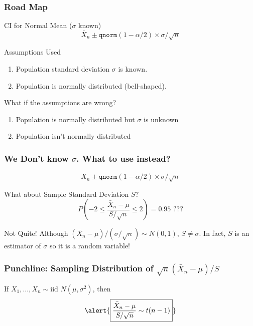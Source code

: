 \begin{frame}
  \frametitle{Road Map}
\begin{block}{CI for Normal Mean ($\sigma$ known)}
  \vspace{-1em}
  \[\bar{X}_n \pm \texttt{qnorm}(1-\alpha/2) \times \sigma/\sqrt{n}\]
\end{block}

\begin{block}{Assumptions Used}
	\begin{enumerate}
\item Population standard deviation $\sigma$ is known.
\item Population is normally distributed (bell-shaped).
\end{enumerate}
\end{block}

\begin{block}{What if the assumptions are wrong?}
\begin{enumerate}
  \item Population is normally distributed but $\sigma$ is unknown
  \item \alert{Population isn't normally distributed}
\end{enumerate}
\end{block}

\end{frame}
\begin{frame}
\frametitle{We Don't know $\sigma$. What to use instead?}
$$\boxed{\bar{X}_n \pm \texttt{qnorm}(1-\alpha/2) \times \sigma/\sqrt{n}}$$

\begin{block}{What about Sample Standard Deviation $S$?}
	$$P\left(-2 \leq \frac{\bar{X}_n-\mu}{S/\sqrt{n}} \leq 2 \right) = 0.95 \mbox{ ???}$$
\end{block}

\begin{block}{Not Quite!}
Although $(\bar{X}_n-\mu)/(\sigma/\sqrt{n})\sim N(0,1)$, $S \neq \sigma$. In fact, $S$ is an \alert{estimator} of $\sigma$ so it is a \alert{random variable!}
\end{block}
\end{frame}
\begin{frame}
\frametitle{Punchline: Sampling Distribution of $\sqrt{n}(\bar{X}_n-\mu)/S$}
If $X_1, \hdots, X_n \sim \mbox{iid } N(\mu,\sigma^2)$, then
	$$\alert{\boxed{\frac{\bar{X}_n - \mu}{S/\sqrt{n}} \sim t(n-1)}}$$
\end{frame}
